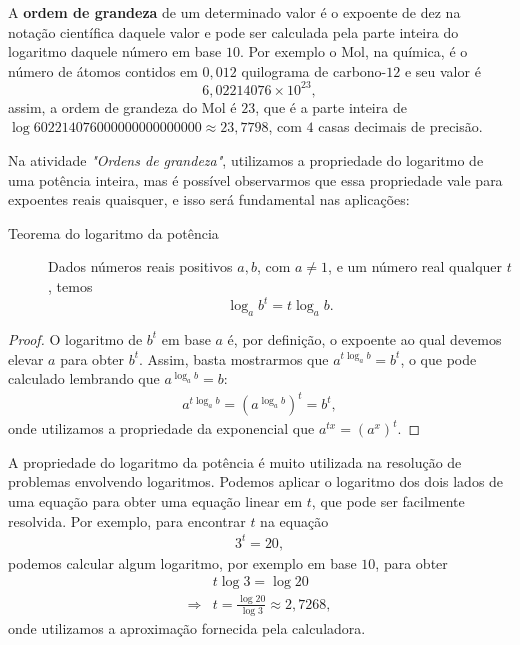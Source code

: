 \begin{knowledge}
A \textbf{ordem de grandeza} de um determinado valor é o expoente de dez na notação científica daquele valor e pode ser calculada pela parte inteira do logaritmo daquele número em base $10$. Por exemplo o Mol, na química, é o número de átomos contidos em $0{,}012$ quilograma de carbono-$12$ e seu valor é
$$
6{,}02214076 \times 10^{23},
$$
assim, a ordem de grandeza do Mol é $23$, que é a parte inteira de $\log 602214076000000000000000 \approx 23{,}7798$, com $4$ casas decimais de precisão.
\end{knowledge}

Na atividade \textit{"Ordens de grandeza"}, utilizamos a propriedade do logaritmo de uma potência inteira, mas é possível observarmos que essa propriedade vale para expoentes reais quaisquer, e isso será fundamental nas aplicações:

 
\begin{description}
\item[Teorema do logaritmo da potência]\label{teo_log_pot} 
Dados números reais positivos $a,b$, com $a \neq 1$, e um número real qualquer $t$, temos
$$
\log_a b^t = t\log_a b.
$$
\end{description}
\begin{proof}
O logaritmo de $b^t$ em base $a$ é, por definição, o expoente ao qual devemos elevar $a$ para obter $b^t$. Assim, basta mostrarmos que $a^{t\log_a b} =b^t$, o que pode calculado lembrando que $a^{\log_a b}=b$:
\begin{align*}
a^{t\log_a b} = (a^{\log_a b})^t = b^t,
\end{align*}
onde utilizamos a propriedade da exponencial que $a^{tx} = (a^{x})^t$.
\end{proof}

\begin{observation}{}
A propriedade do logaritmo da potência é muito utilizada na resolução de problemas envolvendo logaritmos. Podemos aplicar o logaritmo dos dois lados de uma equação para obter uma equação linear em $t$, que pode ser facilmente resolvida. Por exemplo, para encontrar $t$ na equação
\begin{align*}
3^t=20,
\end{align*}
podemos calcular algum logaritmo, por exemplo em base $10$, para obter
\begin{align*}
&t\log 3=\log 20\\
\Longrightarrow &t = \frac{\log 20}{\log 3} \approx 2{,}7268,
\end{align*}
onde utilizamos a aproximação fornecida pela calculadora.
\end{observation}


